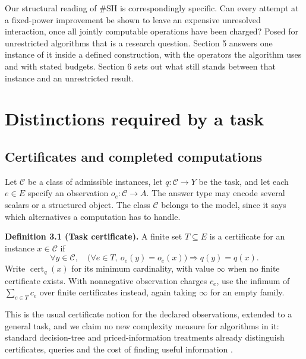 \documentclass[11pt,letterpaper]{article}
\newenvironment{manualdefinition}{%
  \par\addvspace{0.7\baselineskip}\begingroup\normalfont\noindent\ignorespaces
}{\par\endgroup\addvspace{0.4\baselineskip}}
\begin{document}
Our structural reading of \#SH is correspondingly specific. Can every
attempt at a fixed-power improvement be shown to leave an expensive
unresolved interaction, once all jointly computable operations have been
charged? Posed for unrestricted algorithms that is a research question.
Section 5 answers one instance of it inside a defined construction, with
the operators the algorithm uses and with stated budgets. Section 6 sets
out what still stands between that instance and an unrestricted result.

\section{Distinctions required by a
task}\label{distinctions-required-by-a-task}

\subsection{Certificates and completed
computations}\label{certificates-and-completed-computations}

Let \(\mathcal C\) be a class of admissible instances, let
\(q:\mathcal C\to Y\) be the task, and let each \(e\in E\) specify an
observation \(o_e:\mathcal C\to A\). The answer type may encode several
scalars or a structured object. The class \(\mathcal C\) belongs to the
model, since it says which alternatives a computation has to handle.

\begin{manualdefinition}

{{\upshape \textbf{Definition 3.1 (Task certificate).}}} A finite set
\(T\subseteq E\) is a certificate for an instance \(x\in\mathcal C\) if
\[\forall y\in\mathcal C,\quad
\bigl(\forall e\in T,\ o_e(y)=o_e(x)\bigr)
\Longrightarrow q(y)=q(x).\] Write \(\operatorname{cert}_q(x)\) for its
minimum cardinality, with value \(\infty\) when no finite certificate
exists. With nonnegative observation charges \(c_e\), use the infimum of
\(\sum_{e\in T}c_e\) over finite certificates instead, again taking
\(\infty\) for an empty family.

\end{manualdefinition}

This is the usual certificate notion for the declared observations,
extended to a general task, and we claim no new complexity measure for
algorithms in it: standard decision-tree and priced-information
treatments already distinguish certificates, queries and the cost of
finding useful information \citetext{\citealp[Section
4.1]{BW02}; \citealp{CFGKRS02}}.
\end{document}

